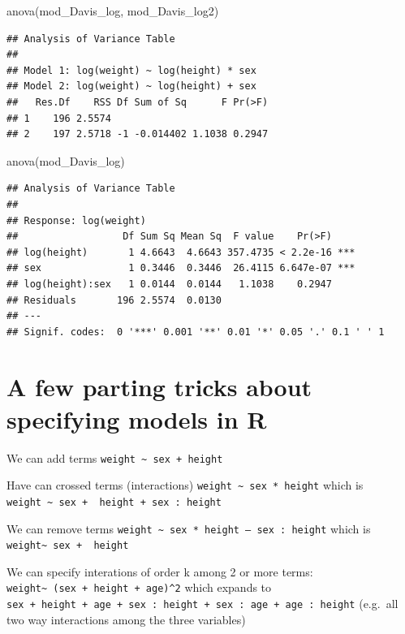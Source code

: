 \documentclass[
]{book}
\newenvironment{Shaded}{\begin{snugshade}}{\end{snugshade}}
\newcommand{\FunctionTok}[1]{\textcolor[rgb]{0.00,0.00,0.00}{#1}}
\newcommand{\NormalTok}[1]{#1}
\begin{document}
\begin{Shaded}
\begin{Highlighting}[]
\FunctionTok{anova}\NormalTok{(mod\_Davis\_log, mod\_Davis\_log2)}
\end{Highlighting}
\end{Shaded}

\begin{verbatim}
## Analysis of Variance Table
## 
## Model 1: log(weight) ~ log(height) * sex
## Model 2: log(weight) ~ log(height) + sex
##   Res.Df    RSS Df Sum of Sq      F Pr(>F)
## 1    196 2.5574                           
## 2    197 2.5718 -1 -0.014402 1.1038 0.2947
\end{verbatim}

\begin{Shaded}
\begin{Highlighting}[]
\FunctionTok{anova}\NormalTok{(mod\_Davis\_log)}
\end{Highlighting}
\end{Shaded}

\begin{verbatim}
## Analysis of Variance Table
## 
## Response: log(weight)
##                  Df Sum Sq Mean Sq  F value    Pr(>F)    
## log(height)       1 4.6643  4.6643 357.4735 < 2.2e-16 ***
## sex               1 0.3446  0.3446  26.4115 6.647e-07 ***
## log(height):sex   1 0.0144  0.0144   1.1038    0.2947    
## Residuals       196 2.5574  0.0130                       
## ---
## Signif. codes:  0 '***' 0.001 '**' 0.01 '*' 0.05 '.' 0.1 ' ' 1
\end{verbatim}

\hypertarget{a-few-parting-tricks-about-specifying-models-in-r}{%
\section{A few parting tricks about specifying models in R}\label{a-few-parting-tricks-about-specifying-models-in-r}}

We can add terms
\texttt{weight\ \textasciitilde{}\ sex\ +\ height}

Have can crossed terms (interactions)
\texttt{weight\ \textasciitilde{}\ sex\ *\ height} which is \texttt{weight\ \textasciitilde{}\ sex\ +\ \ height\ +\ sex\ :\ height}

We can remove terms
\texttt{weight\ \textasciitilde{}\ sex\ *\ height\ –\ sex\ :\ height} which is \texttt{weight\textasciitilde{}\ sex\ +\ \ height}

We can specify interations of order k among 2 or more terms:
\texttt{weight\textasciitilde{}\ (sex\ +\ height\ +\ age)\^{}2} which expands to \texttt{sex\ +\ height\ +\ age\ +\ sex\ :\ height\ +\ sex\ :\ age\ +\ age\ :\ height} (e.g.~all two way interactions among the three variables)
\end{document}

